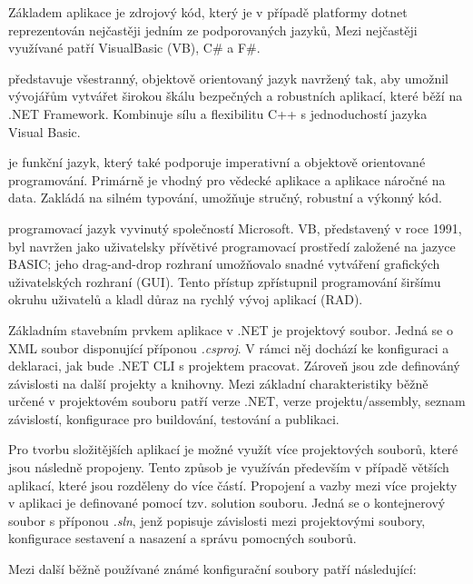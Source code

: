 
Základem aplikace je zdrojový kód, který je v případě platformy dotnet reprezentován nejčastěji jedním ze podporovaných jazyků, Mezi nejčastěji využívané patří VisualBasic (VB), C\# a F\#.



představuje všestranný, objektově orientovaný jazyk navržený tak, aby umožnil vývojářům vytvářet širokou škálu bezpečných a robustních aplikací, které běží na .NET Framework. Kombinuje sílu a flexibilitu C++ s jednoduchostí jazyka Visual Basic.


je funkční jazyk, který také podporuje imperativní a objektově orientované programování. Primárně je vhodný pro vědecké aplikace a aplikace náročné na data. Zakládá na silném typování, umožňuje stručný, robustní a výkonný kód.


programovací jazyk vyvinutý společností Microsoft. VB, představený v roce 1991, byl navržen jako uživatelsky přívětivé programovací prostředí založené na jazyce BASIC; jeho drag-and-drop rozhraní umožňovalo snadné vytváření grafických uživatelských rozhraní (GUI). Tento přístup zpřístupnil programování širšímu okruhu uživatelů a kladl důraz na rychlý vývoj aplikací (RAD).


Základním stavebním prvkem aplikace v .NET je projektový soubor. Jedná se o XML soubor disponující příponou \emph{.csproj}. V rámci něj dochází ke konfiguraci a deklaraci, jak bude .NET CLI s projektem pracovat. Zároveň jsou zde definováný závislosti na další projekty a knihovny. Mezi základní charakteristiky běžně určené v projektovém souboru patří verze .NET, verze projektu/assembly, seznam závislostí, konfigurace pro buildování, testování a publikaci.

Pro tvorbu složitějších aplikací je možné využít více projektových souborů, které jsou následně propojeny. Tento způsob je využíván především v případě větších aplikací, které jsou rozděleny do více částí. Propojení a vazby mezi více projekty v aplikaci je definované pomocí tzv. solution souboru. Jedná se o kontejnerový soubor s příponou \emph{.sln}, jenž popisuje závislosti mezi projektovými soubory, konfigurace sestavení a nasazení a správu pomocných souborů.

Mezi další běžně používané známé konfigurační soubory patří následující:

